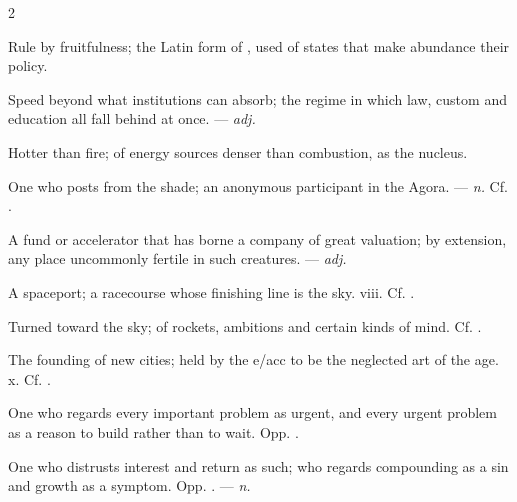 \begin{multicols}{2}

 Rule by fruitfulness; the Latin form of , used of states that make abundance their policy.

 Speed beyond what institutions can absorb; the regime in which law, custom and education all fall behind at once. —  \textit{adj.}

 Hotter than fire; of energy sources denser than combustion, as the nucleus. 

 One who posts from the shade; an anonymous participant in the Agora. —  \textit{n.} Cf. .

  A fund or accelerator that has borne a company of great valuation; by extension, any place uncommonly fertile in such creatures. —  \textit{adj.}

 A spaceport; a racecourse whose finishing line is the sky.   viii. Cf. .

 Turned toward the sky; of rockets, ambitions and certain kinds of mind. Cf. .

 The founding of new cities; held by the e/acc to be the neglected art of the age.   x. Cf. .

 One who regards every important problem as urgent, and every urgent problem as a reason to build rather than to wait. Opp. .

 One who distrusts interest and return as such; who regards compounding as a sin and growth as a symptom. Opp. . —  \textit{n.}

\end{multicols}

